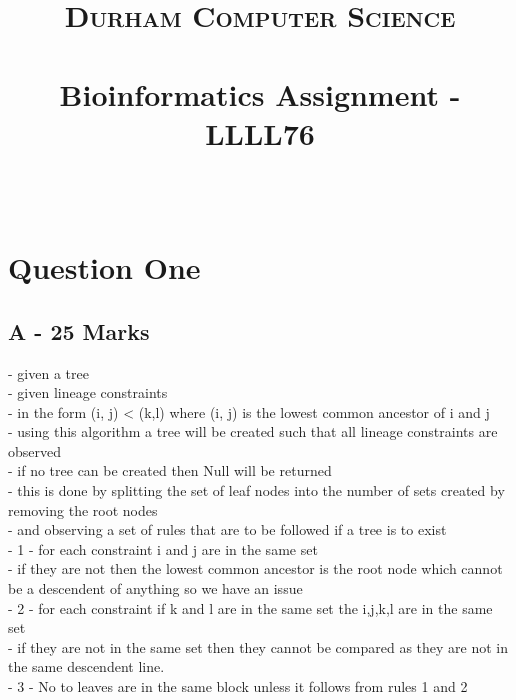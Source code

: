 \documentclass[paper=a4, fontsize=11pt]{scrartcl}
\date{}
\title{
		\vspace{-1in} 	
		\usefont{OT1}{bch}{b}{n}
		\normalfont \normalsize \textsc{Durham Computer Science} \\ [5pt]
		\horrule{0.5pt} \\[0.4cm]
		\large  Bioinformatics Assignment - LLLL76\\
		\horrule{2pt} \\[0.5cm]
		\vspace{-1in} 	
}
\numberwithin{equation}{section}		%
\numberwithin{figure}{section}			%
\numberwithin{table}{section}				%
\begin{document}
\maketitle
\section*{Question One}

\iffalse
This question is about the Build algorithm from A. V. Aho, Y. Sagiv, T. G. Szymanski, J. D. Ullman. Inferring a tree from lowest common ancestors with an application to the optimization of relational expressions. SIAM Journal on Computing
\fi

\subsection*{A - 25 Marks}

\iffalse
Explain what the algorithm does and how it works in your own words. Do not use pseudocode
\fi

- given a tree \\
- given lineage constraints \\
- in the form (i, j) < (k,l) where (i, j) is the lowest common ancestor of i and j \\
- using this algorithm a tree will be created such that all lineage constraints are observed \\
- if no tree can be created then Null will be returned \\
- this is done by splitting the set of leaf nodes into the number of sets created by removing the root nodes \\
- and observing a set of rules that are to be followed if a tree is to exist \\
- 1 - for each constraint i and j are in the same set \\
- if they are not then the lowest common ancestor is the root node which cannot be a descendent of anything so we have an issue \\
- 2 - for each constraint if k and l are in the same set the i,j,k,l are in the same set \\
- if they are not in the same set then they cannot be compared as they are not in the same descendent line.\\
- 3 - No to leaves are in the same block unless it follows from rules 1 and 2\\
\end{document}
